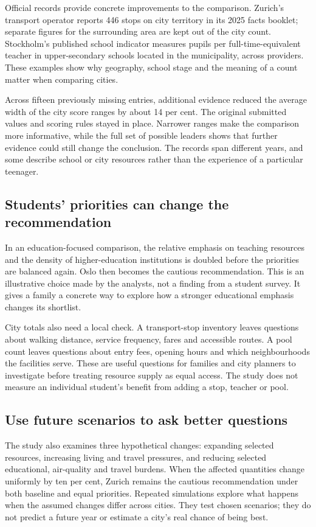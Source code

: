 Official records provide concrete improvements to the comparison. Zurich's transport operator reports 446 stops on city territory in its 2025 facts booklet; separate figures for the surrounding area are kept out of the city count. Stockholm's published school indicator measures pupils per full-time-equivalent teacher in upper-secondary schools located in the municipality, across providers. These examples show why geography, school stage and the meaning of a count matter when comparing cities.

Across fifteen previously missing entries, additional evidence reduced the average width of the city score ranges by about 14 per cent. The original submitted values and scoring rules stayed in place. Narrower ranges make the comparison more informative, while the full set of possible leaders shows that further evidence could still change the conclusion. The records span different years, and some describe school or city resources rather than the experience of a particular teenager.

\newpage
\subsection*{Students' priorities can change the recommendation}

In an education-focused comparison, the relative emphasis on teaching resources and the density of higher-education institutions is doubled before the priorities are balanced again. Oslo then becomes the cautious recommendation. This is an illustrative choice made by the analysts, not a finding from a student survey. It gives a family a concrete way to explore how a stronger educational emphasis changes its shortlist.

City totals also need a local check. A transport-stop inventory leaves questions about walking distance, service frequency, fares and accessible routes. A pool count leaves questions about entry fees, opening hours and which neighbourhoods the facilities serve. These are useful questions for families and city planners to investigate before treating resource supply as equal access. The study does not measure an individual student's benefit from adding a stop, teacher or pool.

\subsection*{Use future scenarios to ask better questions}

The study also examines three hypothetical changes: expanding selected resources, increasing living and travel pressures, and reducing selected educational, air-quality and travel burdens. When the affected quantities change uniformly by ten per cent, Zurich remains the cautious recommendation under both baseline and equal priorities. Repeated simulations explore what happens when the assumed changes differ across cities. They test chosen scenarios; they do not predict a future year or estimate a city's real chance of being best.

